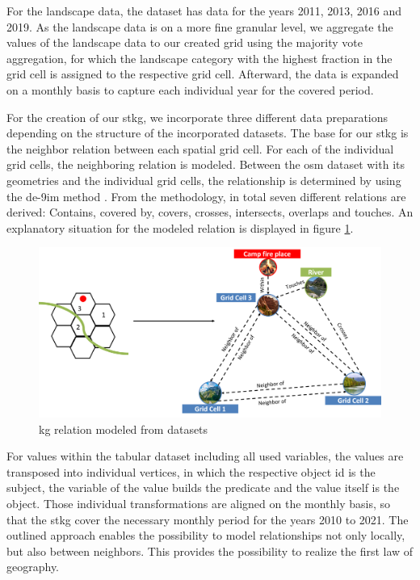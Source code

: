 \documentclass[
]{ceurart}
\begin{document}
For the landscape data, the dataset has data for the years 2011, 2013, 2016 and 2019. As the landscape data is on a more fine granular level, we aggregate the values of the landscape data to our created grid using the majority vote aggregation, for which the landscape category with the highest fraction in the grid cell is assigned to the respective grid cell. Afterward, the data is expanded on a monthly basis to capture each individual year for the covered period.

For the creation of our \gls*{stkg}, we incorporate three different data preparations depending on the structure of the incorporated datasets. The base for our \gls*{stkg} is the neighbor relation between each spatial grid cell. For each of the individual grid cells, the neighboring relation is modeled. Between the \gls*{osm} dataset with its geometries and the individual grid cells, the relationship is determined by using the \gls*{de-9im} method \cite{Clementini.1993}. From the methodology, in total seven different relations are derived: Contains, covered by, covers, crosses, intersects, overlaps and touches. An explanatory situation for the modeled relation is displayed in figure \ref{fig:RelationKG}.

\begin{figure}[ht]
	\centering
	\includegraphics[width = 1\textwidth]{img/RelationGrid.png}
	\caption{\gls*{kg} relation modeled from datasets}
	\label{fig:RelationKG}
\end{figure}

For values within the tabular dataset including all used variables, the values are transposed into individual vertices, in which the respective object \gls*{id} is the subject, the variable of the value builds the predicate and the value itself is the object. Those individual transformations are aligned on the monthly basis, so that the \gls*{stkg} cover the necessary monthly period for the years 2010 to 2021. The outlined approach enables the possibility to model relationships not only locally, but also between neighbors. This provides the possibility to realize the first law of geography.
\end{document}
